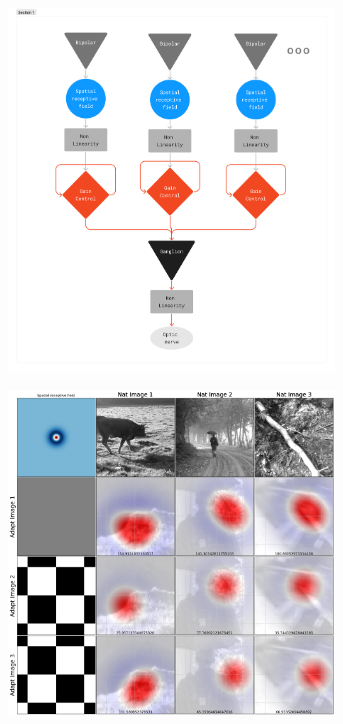 \begin{figure}
    \centering
    \begin{subfigure}{.5\textwidth}
        \includegraphics[width=0.95\textwidth]{pics/GCModelDiagram.png}
        \label{fig:LNLN}
    \end{subfigure}%
    \begin{subfigure}{.5\textwidth}
        \includegraphics[width=0.95\textwidth]{pics/exModel.png}

\end{subfigure}
\end{figure}
